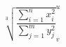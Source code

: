 \begin{equation*}
 \sqrt[3]{
   \frac{\displaystyle\sum_{i=1}^n x_i^2}
        {\displaystyle\sum_{j=1}^m y_j^2}
 }^{u}_{v}
\end{equation*}
